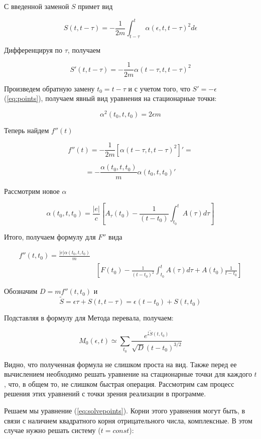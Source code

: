 \documentclass[14pt]{extarticle}
\begin{document}
С введенной заменой $S$ примет вид

$$
S(t, t-\tau) = -\frac{1}{2m}\int_{t-\tau}^{t} \alpha(\epsilon, t, t-\tau)^2 d\epsilon
$$

Дифференцируя по $\tau$, получаем

$$
S'(t, t-\tau) = -\frac{1}{2m} \alpha(t-\tau, t, t-\tau)^2
$$

Произведем обратную замену $t_0 = t-\tau$ и с учетом того, что $S' = -\epsilon$ (\ref{eq:points}), получаем явный вид уравнения на стационарные точки:

\begin{equation}\label{eq:solvepoints}
\alpha ^2 (t_0, t, t_0) = 2 \epsilon m
\end{equation}

Теперь найдем $f''(t)$

$$
f''(t) = -\frac{1}{2m}\left[\alpha(t-\tau, t, t-\tau)^2\right]' =
$$

$$
= -\frac{\alpha(t_0, t, t_0)}{m} \alpha(t_0, t, t_0)'
$$

Рассмотрим новое $\alpha$

$$
\alpha(t_0, t, t_0) = \frac{|e|}{c} \left[A_{\tau}(t_0) - \frac{1}{(t-t_0)}\int_{t_0}^{t}A(\tau) d\tau\right]
$$

Итого, получаем формулу для $F''$ вида

\begin{eqnarray}
f''(t, t_0) = \frac{|e|\alpha(t_0, t, t_0)}{m} \nonumber \\
& \left[F(t_0) - \frac{1}{(t - t_0)^2} \int_{t_0}^{t}A(\tau)d\tau + A(t_0) \frac{1}{t-t_0} \right] \nonumber
\end{eqnarray}


Обозначим $D = m f''(t, t_0)$ и $$\widetilde{S} = \epsilon \tau + S(t, t-\tau) = \epsilon(t-t_0) + S(t, t_0)$$

Подставляя в формулу для Метода перевала, получаем:

$$
M_0(\epsilon, t) \simeq \sum_{t_0}\frac{e^{\frac{i}{}\widetilde{S}(t, t_0)} }{\sqrt{D} (t-t_0)^{3/2}}
$$

Видно, что полученная формула не слишком проста на вид. Также перед ее вычислением необходимо решать уравнение на стационарные точки для каждого $t$, что, в общем то, не слишком быстрая операция. Рассмотрим сам процесс решения этих уравнений с точки зрения реализации в программе.

Решаем мы уравнение (\ref{eq:solvepoints}). Корни этого уравнения могут быть, в связи с наличием квадратного корня отрицательного числа, комплексные. В этом случае нужно решать систему ($t = const$):
\end{document}
